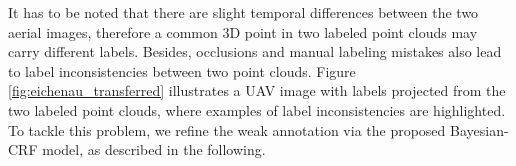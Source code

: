 It has to be noted that there are slight temporal differences between the two aerial images, therefore a common 3D point in two labeled point clouds may carry different labels. Besides, occlusions and manual labeling mistakes also lead to label inconsistencies between two point clouds. Figure \ref{fig:eichenau_transferred} illustrates a UAV image with labels projected from the two labeled point clouds, where examples of label inconsistencies are highlighted. To tackle this problem, we refine the weak annotation via the proposed Bayesian-CRF model, as described in the following.


\begin{figure}[htb]
 \begin{subfigure}{0.485\columnwidth}
   \centering
{}
   \caption{}  
 \end{subfigure}
~
 \begin{subfigure}{0.485\columnwidth}
   \centering
\end{subfigure}
\end{figure}
